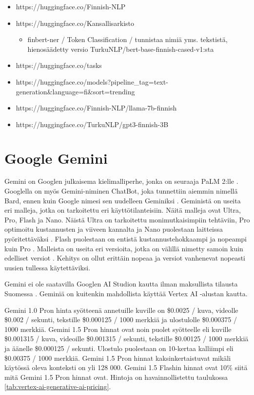 \begin{itemize}
\begin{itemize}
  \end{itemize}
  \item https://huggingface.co/Finnish-NLP
  \item https://huggingface.co/Kansallisarkisto
  \begin{itemize}
    \item finbert-ner / Token Classification / tunnistaa nimiä yms. tekstistä, hienosäädetty versio TurkuNLP/bert-base-finnish-cased-v1:sta
  \end{itemize}
  \item https://huggingface.co/tasks
  \item https://huggingface.co/models?pipeline\_tag=text-generation\&language=fi\&sort=trending
  \item https://huggingface.co/Finnish-NLP/llama-7b-finnish
  \item https://huggingface.co/TurkuNLP/gpt3-finnish-3B
\end{itemize}

\section{Google Gemini}

Gemini on Googlen julkaisema kielimalliperhe, jonka on seuraaja PaLM 2:lle
\parencite{googleKeynote2023}. Googlella on myös Gemini-niminen ChatBot, joka
tunnettiin aiemmin nimellä Bard, ennen kuin Google nimesi sen uudelleen
Geminiksi \parencite{geminiUpdates}. Geministä on useita eri malleja, jotka on
tarkoitettu eri käyttötilanteisiin. Näitä malleja ovat Ultra, Pro, Flash ja
Nano. \parencite{googleDeepmindGemini} Näistä Ultra on tarkoitettu
monimutkaisimpiin tehtäviin, Pro optimoitu kustannusten ja viiveen kannalta ja
Nano puolestaan laitteissa pyöritettäväksi
\parencite{googleDeepmindGeminiv1report}. Flash puolestaan on entistä
kustannustehokkaampi ja nopeampi kuin Pro \parencite{googleKeynote2024}.
Malleista on useita eri versioita, jotka on välillä nimetty samoin kuin
edelliset versiot \parencite{googleDeepmindGeminiv1_5report}. Kehitys on ollut
erittäin nopeaa ja versiot vanhenevat nopeasti uusien tullessa käytettäviksi.


Gemini ei ole saatavilla Googlen AI Studion kautta ilman maksullista tilausta
Suomessa \parencite{googleAiAvailableRegions}. Geminiä on kuitenkin mahdollista
käyttää Vertex AI -alustan kautta.

Gemini 1.0 Pron hinta syötteenä annetuille kuville on \$0.0025 / kuva, videolle
\$0.002 / sekunti, tekstille \$0.000125 / 1000 merkkiä ja ulostulolle
\$0.000375 / 1000 merkkiä. Gemini 1.5 Pron hinnat ovat noin puolet syötteelle
eli kuville \$0.001315 / kuva, videoille \$0.001315 / sekunti, tekstille
\$0.00125 / 1000 merkkiä ja äänelle \$0.000125 / sekunti. Ulostulo puolestaan
on 10-kertaa kalliimpi eli \$0.00375 / 1000 merkkiä. Gemini 1.5 Pron hinnat
kaksinkertaistuvat mikäli käytössä oleva konteksti on yli 128 000. Gemini
1.5 Flashin hinnat ovat 10\% siitä mitä Gemini 1.5 Pron hinnat ovat.
\parencite{vertexAiGenerativeAiPricing} Hintoja on havainnollistettu taulukossa
\ref{tab:vertex-ai-generative-ai-pricing}.

